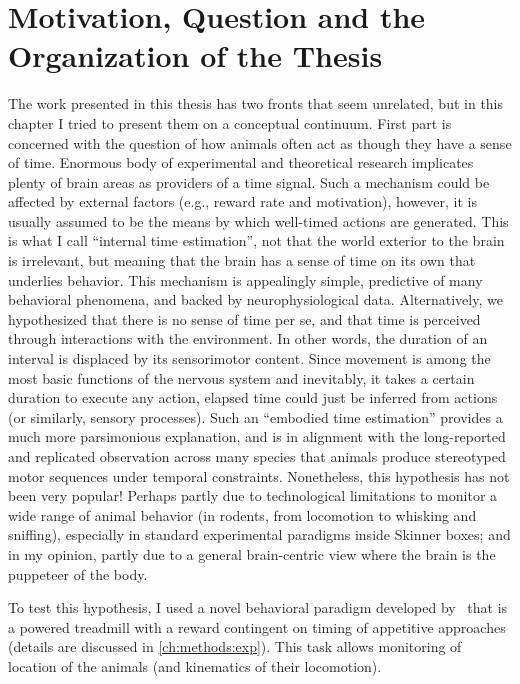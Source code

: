 \section[Motivation, Question and More]{Motivation, Question and the Organization of the Thesis}
\label{intro:question}

The work presented in this thesis has two fronts that seem unrelated, but in this chapter I tried to present them on a conceptual continuum.
First part is concerned with the question of how animals often act as though they have a sense of time.
Enormous body of experimental and theoretical research implicates plenty of brain areas as providers of a time signal.
Such a mechanism could be affected by external factors (e.g., reward rate and motivation), however, it is usually assumed to be the means by which well-timed actions are generated.
This is what I call ``internal time estimation'', not that the world exterior to the brain is irrelevant, but meaning that the brain has a sense of time on its own that underlies behavior.
This mechanism is appealingly simple, predictive of many behavioral phenomena, and backed by neurophysiological data.
Alternatively, we hypothesized that there is no sense of time per se, and that time is perceived through interactions with the environment.
In other words, the duration of an interval is displaced by its sensorimotor content.
Since movement is among the most basic functions of the nervous system and inevitably, it takes a certain duration to execute any action, elapsed time could just be inferred from actions (or similarly, sensory processes).
Such an ``embodied time estimation'' provides a much more parsimonious explanation, and is in alignment with the long-reported and replicated observation across many species that animals produce stereotyped motor sequences under temporal constraints.
Nonetheless, this hypothesis has not been very popular!
Perhaps partly due to technological limitations to monitor a wide range of animal behavior (in rodents, from locomotion to whisking and sniffing), especially in standard experimental paradigms inside Skinner boxes; and in my opinion, partly due to a general brain-centric view where the brain is the puppeteer of the body.
\par
To test this hypothesis, I used a novel behavioral paradigm developed by~\citeauthor{Rueda2015NN} that is a powered treadmill with a reward contingent on timing of appetitive approaches (details are discussed in \autoref{ch:methods:exp}).
This task allows monitoring of location of the animals (and kinematics of their locomotion).
